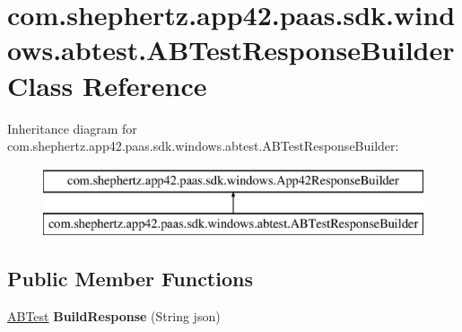 \hypertarget{classcom_1_1shephertz_1_1app42_1_1paas_1_1sdk_1_1windows_1_1abtest_1_1_a_b_test_response_builder}{\section{com.\+shephertz.\+app42.\+paas.\+sdk.\+windows.\+abtest.\+A\+B\+Test\+Response\+Builder Class Reference}
\label{classcom_1_1shephertz_1_1app42_1_1paas_1_1sdk_1_1windows_1_1abtest_1_1_a_b_test_response_builder}
}
Inheritance diagram for com.\+shephertz.\+app42.\+paas.\+sdk.\+windows.\+abtest.\+A\+B\+Test\+Response\+Builder\+:\begin{figure}[H]
\begin{center}
\leavevmode
\includegraphics[height=2.000000cm]{classcom_1_1shephertz_1_1app42_1_1paas_1_1sdk_1_1windows_1_1abtest_1_1_a_b_test_response_builder}
\end{center}
\end{figure}
\subsection*{Public Member Functions}
\begin{DoxyCompactItemize}
\item 
\hypertarget{classcom_1_1shephertz_1_1app42_1_1paas_1_1sdk_1_1windows_1_1abtest_1_1_a_b_test_response_builder_ad5ccc7037410363e281313012edeb0c0}{\hyperlink{classcom_1_1shephertz_1_1app42_1_1paas_1_1sdk_1_1windows_1_1abtest_1_1_a_b_test}{A\+B\+Test} {\bfseries Build\+Response} (String json)}\label{classcom_1_1shephertz_1_1app42_1_1paas_1_1sdk_1_1windows_1_1abtest_1_1_a_b_test_response_builder_ad5ccc7037410363e281313012edeb0c0}

\end{DoxyCompactItemize}
